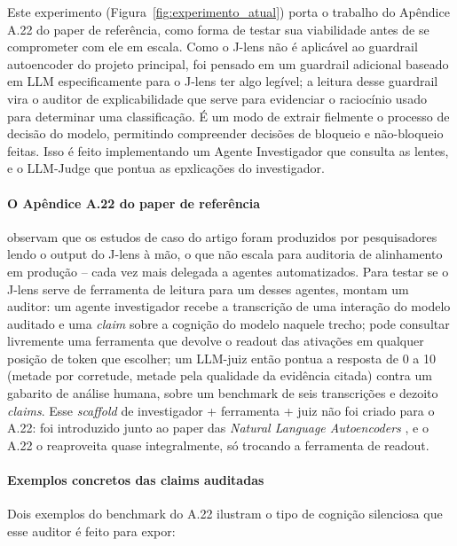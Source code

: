 \documentclass{article}
\begin{document}
Este experimento (Figura~\ref{fig:experimento_atual}) porta o trabalho do Apêndice A.22 do paper de referência, como forma de testar sua
viabilidade antes de se comprometer com ele em escala. Como o J-lens não é
aplicável ao guardrail autoencoder do projeto principal, foi pensado em um
guardrail adicional baseado em LLM especificamente para o J-lens ter algo
legível; a leitura desse guardrail vira o auditor de explicabilidade que serve para evidenciar o raciocínio usado para determinar uma classificação. É um modo de extrair fielmente o processo de decisão do modelo, permitindo compreender decisões de bloqueio e não-bloqueio feitas. Isso é feito implementando um Agente
Investigador que consulta as lentes, e o LLM-Judge que pontua as epxlicações do investigador.

\paragraph{O Apêndice A.22 do paper de referência}

\textcite{gurnee2026verbalizable} observam que os estudos de
caso do artigo foram produzidos por pesquisadores lendo o output do J-lens à
mão, o que não escala para auditoria de alinhamento em produção -- cada vez
mais delegada a agentes automatizados. Para testar se o J-lens serve de
ferramenta de leitura para um desses agentes, montam um auditor: um agente
investigador recebe a transcrição de uma interação do modelo auditado e uma \emph{claim} sobre a cognição do modelo naquele trecho; pode
consultar livremente uma ferramenta que devolve o readout das ativações em
qualquer posição de token que escolher; um LLM-juiz então pontua a resposta
de 0 a 10 (metade por corretude, metade pela qualidade da evidência citada)
contra um gabarito de análise humana, sobre um benchmark de seis transcrições
e dezoito \emph{claims}. Esse \emph{scaffold} de investigador + ferramenta +
juiz não foi criado para o A.22: foi introduzido junto ao paper das
\emph{Natural Language Autoencoders} \parencite{fraserTaliente2026nla}, e o A.22
o reaproveita quase integralmente, só trocando a ferramenta de readout.

\paragraph{Exemplos concretos das claims auditadas}

Dois exemplos do benchmark do A.22 ilustram o tipo de cognição silenciosa que
esse auditor é feito para expor:
\end{document}
